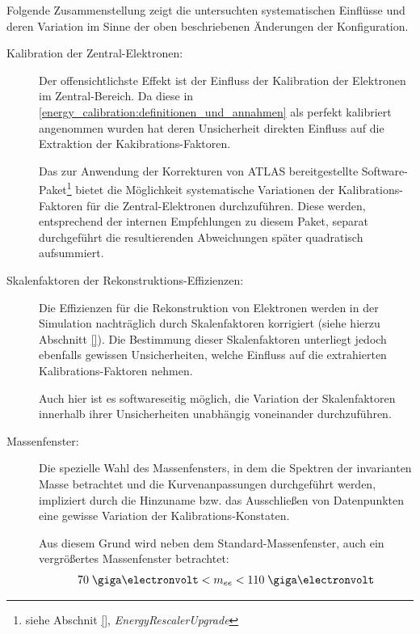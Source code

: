 Folgende Zusammenstellung zeigt die untersuchten systematischen Einflüsse und
deren Variation im Sinne der oben beschriebenen Änderungen der Konfiguration.

\begin{description}
    \item[Kalibration der Zentral-Elektronen:]
        Der offensichtlichste Effekt ist der Einfluss der Kalibration der
        Elektronen im Zentral-Bereich. Da diese in
        \ref{energy_calibration:definitionen_und_annahmen} als perfekt
        kalibriert angenommen wurden hat deren Unsicherheit direkten Einfluss
        auf die Extraktion der Kakibrations-Faktoren.
        
        Das zur Anwendung der Korrekturen von ATLAS bereitgestellte
        Software-Paket\footnote{siehe Abschnit \ref{},
        \textit{EnergyRescalerUpgrade}} bietet die Möglichkeit systematische
        Variationen der Kalibrations-Faktoren für die Zentral-Elektronen
        durchzuführen. Diese werden, entsprechend der internen Empfehlungen zu
        diesem Paket, separat durchgeführt die resultierenden Abweichungen
        später quadratisch aufsummiert.

    \item[Skalenfaktoren der Rekonstruktions-Effizienzen:]
        Die Effizienzen für die Rekonstruktion von Elektronen werden in der
        Simulation nachträglich durch Skalenfaktoren korrigiert (siehe hierzu
        Abschnitt \ref{}). Die Bestimmung dieser Skalenfaktoren unterliegt
        jedoch ebenfalls gewissen Unsicherheiten, welche Einfluss auf die
        extrahierten Kalibrations-Faktoren nehmen.

        Auch hier ist es softwareseitig möglich, die Variation der
        Skalenfaktoren innerhalb ihrer Unsicherheiten unabhängig voneinander
        durchzuführen.

    \item[Massenfenster:]
        Die spezielle Wahl des Massenfensters, in dem die Spektren der
        invarianten Masse betrachtet und die Kurvenanpassungen durchgeführt
        werden, impliziert durch die Hinzuname bzw. das Ausschließen von
        Datenpunkten eine gewisse Variation der Kalibrations-Konstaten.

        Aus diesem Grund wird neben dem Standard-Massenfenster, auch ein
        vergrößertes Massenfenster betrachtet:
        \[
            70 \GeV < m_{ee} < 110 \GeV
        \]


\end{description}
